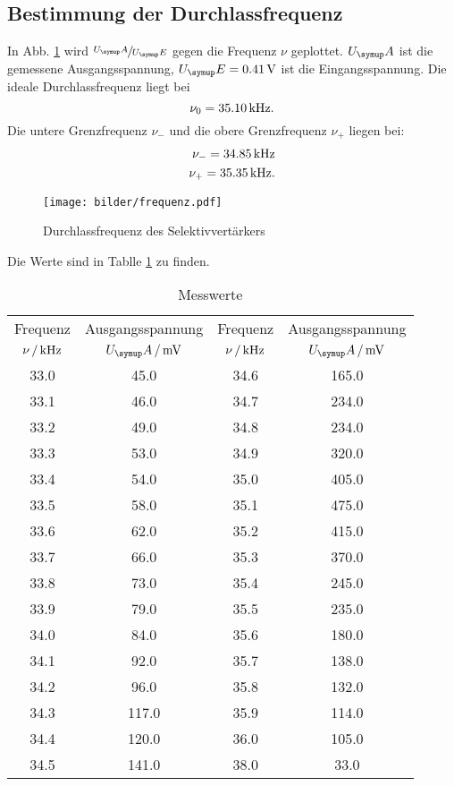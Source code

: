 \subsection{Bestimmung der Durchlassfrequenz}
In Abb. \ref{fig:Durchlass} wird $\sfrac{U_\su{A}}{U_\su{E}}$ gegen die Frequenz
$\nu$ geplottet. $U_\su{A}$ ist die gemessene Ausgangsspannung, $U_\su{E} = 0.41\,\si{\volt}$
ist die Eingangsspannung.
Die ideale Durchlassfrequenz liegt bei
\begin{equation}
  \nu_0 = 35.10 \,\si{\kilo\hertz}.
\end{equation}
Die untere Grenzfrequenz $\nu_-$ und die obere Grenzfrequenz $\nu_+$ liegen bei:
\begin{align}
  \nu_- = 34.85 \,\si{\kilo\hertz} \\
  \nu_+ = 35.35 \,\si{\kilo\hertz}.
\end{align}
\begin{figure}
  \centering
  \texttt{[image: bilder/frequenz.pdf]}
  \caption{Durchlassfrequenz des Selektivvertärkers}
  \label{fig:Durchlass}
\end{figure}
Die Werte sind in Tablle \ref{tab:werte} zu finden.
\newpage
\begin{table}
  \centering
  \begin{tabular}{cc|cc}
    \toprule
    \multicolumn{1}{c}{Frequenz} & \multicolumn{1}{c|}{Ausgangsspannung} &
    \multicolumn{1}{c}{Frequenz} & \multicolumn{1}{c}{Ausgangsspannung} \\
    {$\nu\,/\,\si{\kilo\hertz}$} & {$U_\su{A}\,/\mV$}& {$\nu\,/\,\si{\kilo\hertz}$} & {$U_\su{A}\,/\mV$} \\
    \midrule
       33.0 &   45.0 & 34.6  &   165.0 \\
       33.1 &   46.0 & 34.7  &   234.0 \\
       33.2 &   49.0 & 34.8  &   234.0 \\
       33.3 &   53.0 & 34.9  &   320.0 \\
       33.4 &   54.0 & 35.0  &   405.0 \\
       33.5 &   58.0 & 35.1  &   475.0 \\
       33.6 &   62.0 & 35.2  &   415.0 \\
       33.7 &   66.0 & 35.3  &   370.0 \\
       33.8 &   73.0 & 35.4  &   245.0 \\
       33.9 &   79.0 & 35.5  &   235.0 \\
       34.0 &   84.0 & 35.6  &   180.0 \\
       34.1 &   92.0 & 35.7  &   138.0 \\
       34.2 &   96.0 & 35.8  &   132.0 \\
       34.3 &  117.0 & 35.9  &   114.0 \\
       34.4 &  120.0 & 36.0  &   105.0 \\
       34.5 &  141.0 & 38.0  &    33.0 \\
  \bottomrule
  \end{tabular}
  \caption{Messwerte}
  \label{tab:werte}
\end{table}
